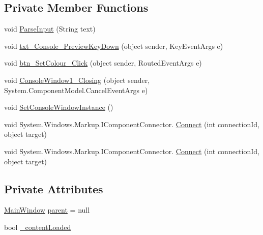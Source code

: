 \subsection*{Private Member Functions}
\begin{DoxyCompactItemize}
\item 
void \hyperlink{class_c_p_u___o_s___simulator_1_1_console_window_abd018f36110bdd5f6420a3277ccf6c18}{Parse\+Input} (String text)
\item 
void \hyperlink{class_c_p_u___o_s___simulator_1_1_console_window_aabd331e8c3a83c87ccd2e09c3959408d}{txt\+\_\+\+Console\+\_\+\+Preview\+Key\+Down} (object sender, Key\+Event\+Args e)
\item 
void \hyperlink{class_c_p_u___o_s___simulator_1_1_console_window_a1de6be8bb7f4f581a9e4131a0408e632}{btn\+\_\+\+Set\+Colour\+\_\+\+Click} (object sender, Routed\+Event\+Args e)
\item 
void \hyperlink{class_c_p_u___o_s___simulator_1_1_console_window_a3d026ba3c0def2d09cc0dd1e92e4cd0d}{Console\+Window1\+\_\+\+Closing} (object sender, System.\+Component\+Model.\+Cancel\+Event\+Args e)
\item 
void \hyperlink{class_c_p_u___o_s___simulator_1_1_console_window_a8719d25b2617a32a78511d9e584d90a0}{Set\+Console\+Window\+Instance} ()
\item 
void System.\+Windows.\+Markup.\+I\+Component\+Connector. \hyperlink{class_c_p_u___o_s___simulator_1_1_console_window_a8fc3e3f38ff00f6239dca33ff68de0d2}{Connect} (int connection\+Id, object target)
\item 
void System.\+Windows.\+Markup.\+I\+Component\+Connector. \hyperlink{class_c_p_u___o_s___simulator_1_1_console_window_a8fc3e3f38ff00f6239dca33ff68de0d2}{Connect} (int connection\+Id, object target)
\end{DoxyCompactItemize}
\subsection*{Private Attributes}
\begin{DoxyCompactItemize}
\item 
\hyperlink{class_c_p_u___o_s___simulator_1_1_main_window}{Main\+Window} \hyperlink{class_c_p_u___o_s___simulator_1_1_console_window_a1e38326bb40f4ed44c4964d94dc6f809}{parent} = null
\item 
bool \hyperlink{class_c_p_u___o_s___simulator_1_1_console_window_a4836f04e93faa3749609d7eba72e1712}{\+\_\+content\+Loaded}
\end{DoxyCompactItemize}


